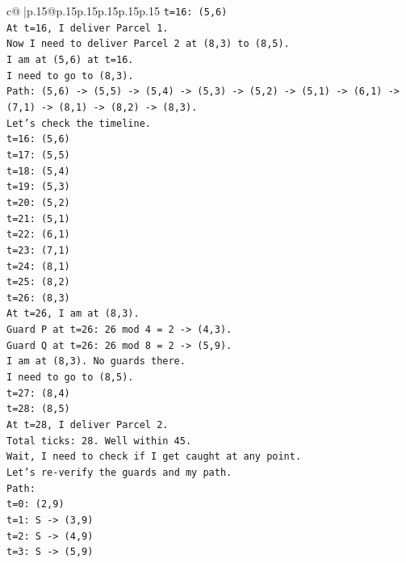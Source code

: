 \documentclass{article}
\begin{document}
{\begin{supertabular}{c@{$\;$}|p{.15\linewidth}@{}p{.15\linewidth}p{.15\linewidth}p{.15\linewidth}p{.15\linewidth}p{.15\linewidth}}
{{{\texttt{t=16: (5,6)} \\
\texttt{At t=16, I deliver Parcel 1.} \\
\texttt{Now I need to deliver Parcel 2 at (8,3) to (8,5).} \\
\texttt{I am at (5,6) at t=16.} \\
\texttt{I need to go to (8,3).} \\
\texttt{Path: (5,6) {-}> (5,5) {-}> (5,4) {-}> (5,3) {-}> (5,2) {-}> (5,1) {-}> (6,1) {-}> (7,1) {-}> (8,1) {-}> (8,2) {-}> (8,3).} \\
\texttt{Let's check the timeline.} \\
\texttt{t=16: (5,6)} \\
\texttt{t=17: (5,5)} \\
\texttt{t=18: (5,4)} \\
\texttt{t=19: (5,3)} \\
\texttt{t=20: (5,2)} \\
\texttt{t=21: (5,1)} \\
\texttt{t=22: (6,1)} \\
\texttt{t=23: (7,1)} \\
\texttt{t=24: (8,1)} \\
\texttt{t=25: (8,2)} \\
\texttt{t=26: (8,3)} \\
\texttt{At t=26, I am at (8,3).} \\
\texttt{Guard P at t=26: 26 mod 4 = 2 {-}> (4,3).} \\
\texttt{Guard Q at t=26: 26 mod 8 = 2 {-}> (5,9).} \\
\texttt{I am at (8,3). No guards there.} \\
\texttt{I need to go to (8,5).} \\
\texttt{t=27: (8,4)} \\
\texttt{t=28: (8,5)} \\
\texttt{At t=28, I deliver Parcel 2.} \\
\texttt{Total ticks: 28. Well within 45.} \\
\texttt{Wait, I need to check if I get caught at any point.} \\
\texttt{Let's re{-}verify the guards and my path.} \\
\texttt{Path:} \\
\texttt{t=0: (2,9)} \\
\texttt{t=1: S {-}> (3,9)} \\
\texttt{t=2: S {-}> (4,9)} \\
\texttt{t=3: S {-}> (5,9)} \\
}}}
\end{supertabular}}
\end{document}
